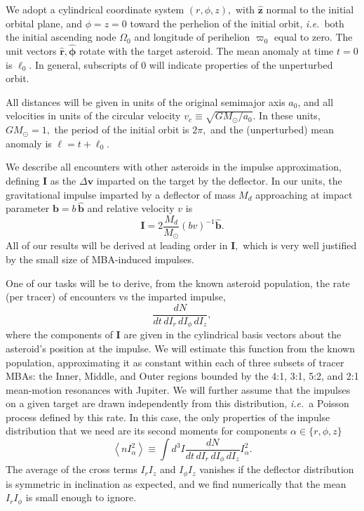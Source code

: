 \documentclass[linenumbers, onecolumn]{aastex631}
\newcommand{\ie}{\textit{i.e.\/}}
\newcommand{\vecI}{\mathbf{I}}
\newcommand{\vecb}{\mathbf{b}}
\newcommand{\bhat}{\mathbf{\hat b}}
\newcommand{\rhat}{\mathbf{\hat r}}
\newcommand{\phat}{\boldsymbol{\hat\phi}}
\newcommand{\zhat}{\mathbf{\hat z}}
\newcommand{\vecv}{\mathbf{v}}
\newcommand{\vcirc}{v_c}
\newcommand{\Msun}{M_\odot}
\newcommand{\lop}{\varpi}   %
\newcommand{\ma}{\ell}  %
\begin{document}
We adopt a cylindrical coordinate system $(r,\phi,z),$ with $\zhat$
normal to the initial orbital plane, and $\phi=z=0$ toward the
perhelion of the initial orbit, \ie\ both the initial ascending node
$\Omega_0$ and longitude of perihelion $\lop_0$ equal to zero.  The
unit vectors $\rhat, \phat$ rotate with the target asteroid.  The mean
anomaly at time $t=0$ is $\ma_0.$  In general, subscripts of $0$ will
indicate properties of the unperturbed orbit.

All distances will be given in units of the original semimajor axis $a_0$, and all velocities in units of the circular velocity $\vcirc \equiv \sqrt{G\Msun/a_0}.$  In these units, $G\Msun=1,$ the period of the initial orbit is $2\pi,$ and the (unperturbed) mean anomaly is $\ma=t+\ma_0.$ 

We describe all encounters with other asteroids in the impulse approximation, defining $\vecI$ as the $\Delta\vecv$ imparted on the target by the deflector.
In our units, the gravitational impulse imparted by a deflector of mass $M_d$ approaching at impact parameter $\vecb=b\,\bhat$ and relative velocity $v$ is
\begin{equation}
  \vecI = 2 \frac{M_d}{\Msun} (bv)^{-1} \bhat.
  \label{eq:impulse}
\end{equation}
All of our results will be derived at leading order in $\vecI,$ which
is very well justified by the small size of MBA-induced impulses.

One of our tasks will be to derive, from the known asteroid population, the rate (per tracer) of encounters vs the imparted impulse,
\begin{equation}
  \frac{dN}{dt\,dI_r\,dI_\phi\,dI_z},
  \label{eq:dN}
\end{equation}
where the components of $\vecI$ are given in the cylindrical basis
vectors about the asteroid's position at the impulse.
We will estimate this function from the known population,
approximating it as constant within each of three subsets of tracer MBAs:
the Inner, Middle, and Outer regions bounded by the 4:1, 3:1,
5:2, and 2:1 mean-motion resonances with Jupiter.
We will further assume that the impulses on a given target are drawn
independently from this distribution, \ie\ a Poisson process defined
by this rate.  In this case, the only properties of the impulse
distribution that we need are its second moments for components $\alpha \in \{r,\phi,z\}$
\begin{equation}
  \left \langle n I_\alpha^2 \right\rangle \equiv \int d^3I \frac{dN}{dt\,dI_r\,dI_\phi\,dI_z} I_\alpha^2.
\label{eq:nvsq}
\end{equation}
The average of the cross terms $I_rI_z$ and $I_\phi I_z$ vanishes if
the deflector distribution is symmetric in inclination as expected, and we find numerically that the mean $I_rI_\phi$ is small enough to ignore.
\end{document}
